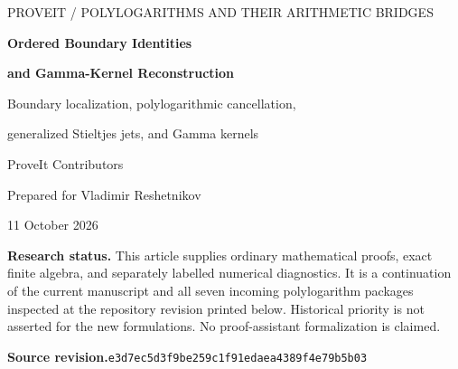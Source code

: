 \documentclass[11pt,a4paper]{article}
\numberwithin{equation}{section}
\theoremstyle{definition}
\theoremstyle{remark}
\begin{document}
\hypersetup{pageanchor=false}
\begin{titlepage}
\centering
\vspace*{16mm}
{\small\sffamily\color{MidnightBlue} PROVEIT \quad / \quad POLYLOGARITHMS AND THEIR ARITHMETIC BRIDGES\par}
\vspace{15mm}
{\LARGE\bfseries Ordered Boundary Identities\par}
\vspace{2mm}
{\Large\bfseries and Gamma-Kernel Reconstruction\par}
\vspace{4mm}
{\Large Boundary localization, polylogarithmic cancellation,\par
 generalized Stieltjes jets, and Gamma kernels\par}
\vspace{13mm}
{\large ProveIt Contributors\par}
\vspace{3mm}
{Prepared for Vladimir Reshetnikov\par}
\vspace{5mm}
{11 October 2026\par}
\vfill
\begin{minipage}{0.88\textwidth}
\small
\textbf{Research status.} This article supplies ordinary mathematical proofs,
exact finite algebra, and separately labelled numerical diagnostics.
It is a continuation of the current manuscript and all seven incoming
polylogarithm packages inspected at the repository revision printed below.
Historical priority is not asserted for the new formulations.
No proof-assistant formalization is claimed.
\par\medskip
\textbf{Source revision.}\quad\texttt{e3d7ec5d3f9be259c1f91edaea4389f4e79b5b03}
\end{minipage}
\vspace{10mm}
\end{titlepage}
\hypersetup{pageanchor=true}

\tableofcontents
\clearpage









\end{document}
